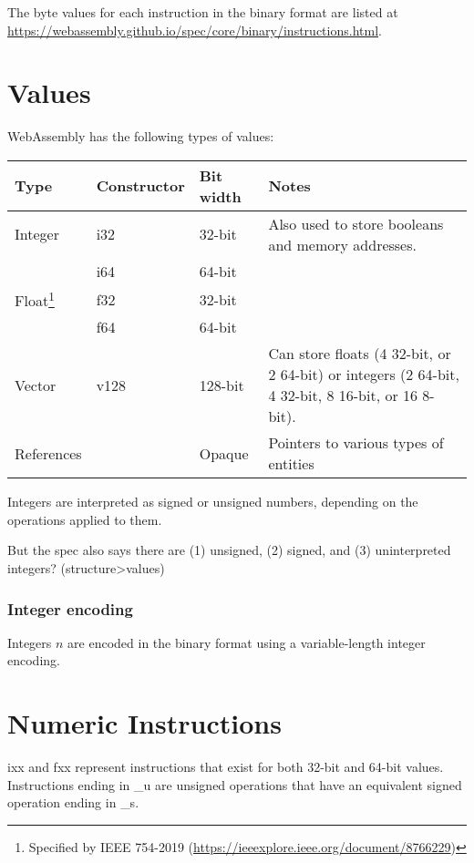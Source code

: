 \documentclass[10pt,a4paper]{article}
\begin{document}
The byte values for each instruction in the binary format are listed at \url{https://webassembly.github.io/spec/core/binary/instructions.html}.

\section*{Values}

WebAssembly has the following types of values:

\begin{tabularx}{\textwidth}{l>{\ttfamily}llX}
\toprule
\textbf{Type} & \normalfont\textbf{Constructor} & \textbf{Bit width} & \textbf{Notes} \\
\midrule
Integer & i32 & 32-bit & Also used to store booleans and memory addresses. \\
& i64 & 64-bit \\
Float\footnote{Specified by IEEE 754-2019 (\url{https://ieeexplore.ieee.org/document/8766229})} & f32 & 32-bit \\
& f64 & 64-bit \\
Vector & v128 & 128-bit & Can store floats (4 32-bit, or 2 64-bit) or integers (2 64-bit, 4 32-bit, 8 16-bit, or 16 8-bit). \\
References & & Opaque & Pointers to various types of entities \\
\bottomrule
\end{tabularx}

Integers are interpreted as signed or unsigned numbers, depending on the operations applied to them.

But the spec also says there are (1) unsigned, (2) signed, and (3) uninterpreted integers? (structure>values)

\subsubsection*{Integer encoding}

Integers $n$ are encoded in the binary format using a variable-length integer encoding.


\section*{Numeric Instructions}

\textsf{ixx} and \textsf{fxx} represent instructions that exist for both 32-bit and 64-bit values. Instructions ending in \textsf{\_u} are unsigned operations that have an equivalent signed operation ending in \textsf{\_s}.
\end{document}
